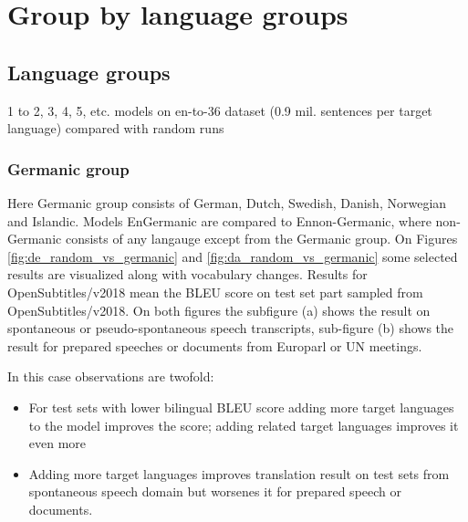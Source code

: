 \chapter{Group by language groups}

\section{Language groups}
1 to 2, 3, 4, 5, etc. models on en-to-36 dataset (0.9 mil. sentences per target language)
compared with random runs
\subsection{Germanic group}
\label{subsection:germanic_group}

Here Germanic group consists of German, Dutch, Swedish, Danish, Norwegian and Islandic.
Models En\to{}Germanic are compared to En\to{}non-Germanic, where non-Germanic consists
of any langauge except from the Germanic group.
On Figures \ref{fig:de_random_vs_germanic} and \ref{fig:da_random_vs_germanic} some selected
results are visualized along with vocabulary changes. Results for OpenSubtitles/v2018 mean
the BLEU score on test set part sampled from OpenSubtitles/v2018.
On both figures the subfigure (a) shows the result on spontaneous or pseudo-spontaneous speech
transcripts, sub-figure (b) shows the result for prepared speeches or documents from Europarl
or UN meetings.

In this case observations are twofold:
\begin{itemize}
	\item For test sets with lower bilingual BLEU score adding more target languages
		to the model improves the score;
		adding related target languages improves it even more
	\item Adding more target languages improves translation result on test
		sets from spontaneous speech domain
		but worsenes it for prepared speech or documents.
\end{itemize}

